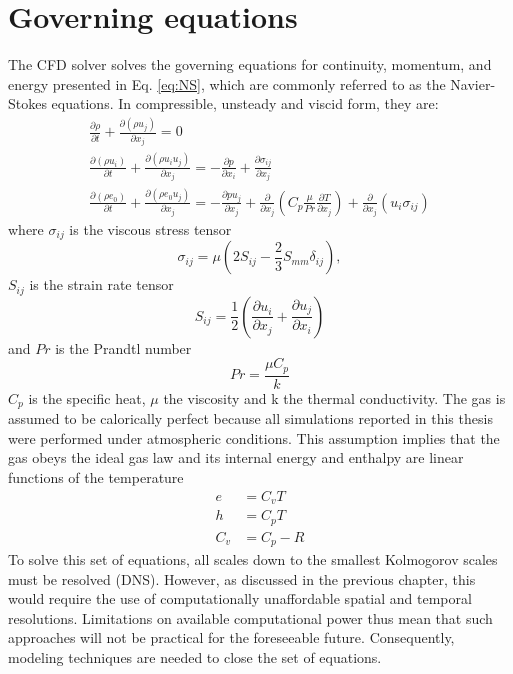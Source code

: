 \section{Governing equations}
The CFD solver solves the governing equations for continuity, momentum, and energy presented in Eq. \ref{eq:NS}, which are commonly referred to as the Navier-Stokes equations. In compressible, unsteady and viscid form, they are:
\begin{equation} 
  \label{eq:NS}
  \begin{gathered}
    \frac{\partial {\rho}}{\partial t} + \frac{\partial \left({\rho} {u}_j \right)}{\partial x_j} = 0 \\
    \frac{\partial \left( {\rho} {u}_i \right)}{\partial t} + \frac{\partial\left({\rho} {u}_i {u}_j \right)}{\partial x_j} = -\frac{\partial p}{\partial x_i} + \frac{\partial {\sigma} _{ij}}{\partial x_j} \\
    \frac{\partial \left( {\rho} {e}_0\right)}{\partial t} + \frac{\partial \left({\rho} {e}_0 {u}_j\right)}{\partial x_j}= -\frac{\partial {p}{u}_j}{\partial x_j}+\frac{\partial}{\partial x_j}\left(C_p\frac{\mu}{Pr}\frac{\partial {T}}{\partial x_j}\right)+\frac{\partial}{\partial x_j}\left({u}_i\sigma_{ij}\right)
  \end{gathered}
\end{equation}
where ${\sigma} _{ij}$ is the viscous stress tensor
\begin{equation}
  {\sigma} _{ij} = \mu \left(2{S}_{ij}-\frac{2}{3}{S}_{mm}\delta _{ij}\right),
\end{equation}
${S}_{ij}$ is the strain rate tensor
\begin{equation}
  {S}_{ij}=\frac{1}{2}\left(\frac{\partial {u}_i}{\partial x_j}+\frac{\partial {u}_j}{\partial x_i}\right)
\end{equation}
and $Pr$ is the Prandtl number
\begin{equation}
  Pr = \frac{\mu C_p}{k}
\end{equation}
$C_p$ is the specific heat, $\mu$ the viscosity and k the thermal conductivity. The gas is assumed to be calorically perfect because all simulations reported in this thesis were performed under atmospheric conditions. This assumption implies that the gas obeys the ideal gas law and its internal energy and enthalpy are linear functions of the temperature
\begin{equation}
  \begin{aligned}
    e &= C_vT \\
    h &= C_pT \\
    C_v &= C_p-R
\end{aligned}
\end{equation}
To solve this set of equations, all scales down to the smallest Kolmogorov scales must be resolved (DNS). However, as discussed in the previous chapter, this would require the use of computationally unaffordable spatial and temporal resolutions. Limitations on available computational power thus mean that such approaches will not be practical for the foreseeable future. Consequently, modeling techniques are needed to close the set of equations. 

